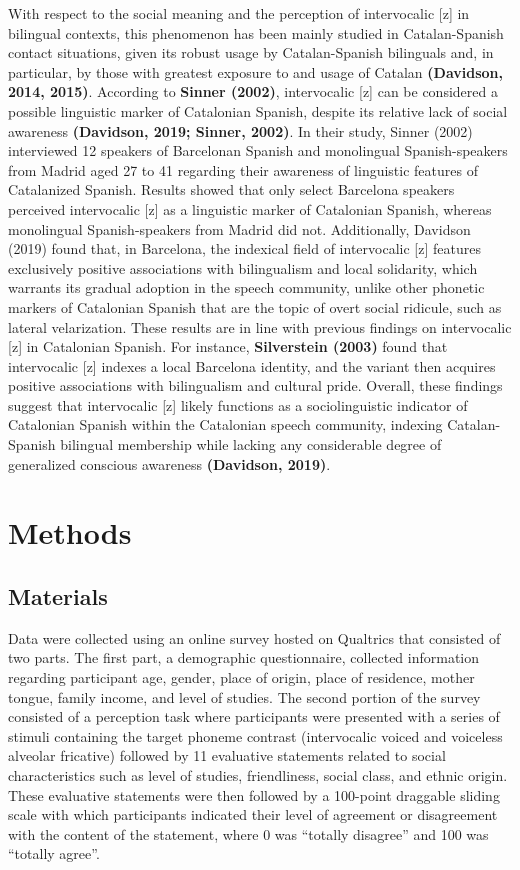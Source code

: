 \documentclass[
  a4paper,
  11pt,
  twocolumn]{article}
\begin{document}
With respect to the social meaning and the perception of intervocalic
{[}z{]} in bilingual contexts, this phenomenon has been mainly studied
in Catalan-Spanish contact situations, given its robust usage by
Catalan-Spanish bilinguals and, in particular, by those with greatest
exposure to and usage of Catalan \textbf{(Davidson, 2014, 2015)}.
According to \textbf{Sinner (2002)}, intervocalic {[}z{]} can be
considered a possible linguistic marker of Catalonian Spanish, despite
its relative lack of social awareness \textbf{(Davidson, 2019; Sinner,
2002)}. In their study, Sinner (2002) interviewed 12 speakers of
Barcelonan Spanish and monolingual Spanish-speakers from Madrid aged 27
to 41 regarding their awareness of linguistic features of Catalanized
Spanish. Results showed that only select Barcelona speakers perceived
intervocalic {[}z{]} as a linguistic marker of Catalonian Spanish,
whereas monolingual Spanish-speakers from Madrid did not. Additionally,
Davidson (2019) found that, in Barcelona, the indexical field of
intervocalic {[}z{]} features exclusively positive associations with
bilingualism and local solidarity, which warrants its gradual adoption
in the speech community, unlike other phonetic markers of Catalonian
Spanish that are the topic of overt social ridicule, such as lateral
velarization. These results are in line with previous findings on
intervocalic {[}z{]} in Catalonian Spanish. For instance,
\textbf{Silverstein (2003)} found that intervocalic {[}z{]} indexes a
local Barcelona identity, and the variant then acquires positive
associations with bilingualism and cultural pride. Overall, these
findings suggest that intervocalic {[}z{]} likely functions as a
sociolinguistic indicator of Catalonian Spanish within the Catalonian
speech community, indexing Catalan-Spanish bilingual membership while
lacking any considerable degree of generalized conscious awareness
\textbf{(Davidson, 2019)}.

\section{Methods}

\subsection{Materials}

Data were collected using an online survey hosted on Qualtrics that
consisted of two parts. The first part, a demographic questionnaire,
collected information regarding participant age, gender, place of
origin, place of residence, mother tongue, family income, and level of
studies. The second portion of the survey consisted of a perception task
where participants were presented with a series of stimuli containing
the target phoneme contrast (intervocalic voiced and voiceless alveolar
fricative) followed by 11 evaluative statements related to social
characteristics such as level of studies, friendliness, social class,
and ethnic origin. These evaluative statements were then followed by a
100-point draggable sliding scale with which participants indicated
their level of agreement or disagreement with the content of the
statement, where 0 was ``totally disagree'' and 100 was ``totally
agree''.
\end{document}
